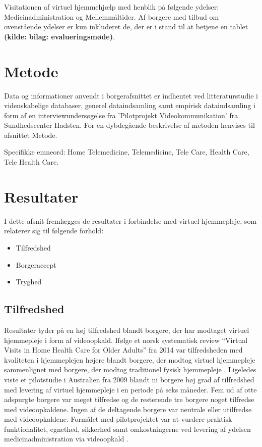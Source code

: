 Visitationen af virtuel hjemmehjælp med henblik på følgende ydelser: Medicinadministration og Mellemmåltider. Af borgere med tilbud om ovenstående ydelser er kun inkluderet de, der er i stand til at betjene en tablet \textbf{(kilde: bilag: evalueringsmøde)}.

\section{Metode}
Data og informationer anvendt i borgerafsnittet er indhentet ved litteraturstudie i videnskabelige databaser, generel dataindsamling samt empirisk dataindsamling i form af en interviewundersøgelse fra ’Pilotprojekt Videokommunikation’ fra Sundhedscenter Hadsten. For en dybdegående beskrivelse af metoden henvises til afsnittet Metode.

Specifikke emneord: Home Telemedicine, Telemedicine, Tele Care, Health Care, Tele Health Care.

\section{Resultater}
I dette afsnit fremlægges de resultater i forbindelse med virtuel hjemmepleje, som relaterer sig til følgende forhold:
\begin{itemize}
	\item Tilfredshed
	\item Borgeraccept 
	\item Tryghed
\end{itemize}

\subsection{Tilfredshed}
Resultater tyder på en høj tilfredshed blandt borgere, der har modtaget virtuel hjemmepleje i form af videoopkald. Ifølge et norsk systematisk review “Virtual Visits in Home Health Care for Older Adults” fra 2014 var tilfredsheden med kvaliteten i hjemmeplejen højere blandt borgere, der modtog virtuel hjemmepleje sammenlignet med borgere, der modtog traditionel fysisk hjemmepleje \cite{Baf2}. Ligeledes viste et pilotstudie i Australien fra 2009 blandt ni borgere høj grad af tilfredshed med levering af virtuel hjemmepleje i en periode på seks måneder. Fem ud af otte adspurgte borgere var meget tilfredse og de resterende tre borgere noget tilfredse med videoopkaldene. Ingen af de deltagende borgere var neutrale eller utilfredse med videoopkaldene. Formålet med pilotprojektet var at vurdere praktisk funktionalitet, egnethed, sikkerhed samt omkostningerne ved levering af ydelsen medicinadministration via videoopkald \cite{wade}. 

